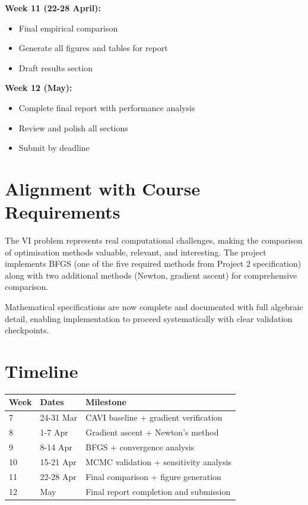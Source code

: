 \documentclass[11pt]{article}
\begin{document}
\textbf{Week 11 (22-28 April):}
\begin{itemize}
\item Final empirical comparison
\item Generate all figures and tables for report
\item Draft results section
\end{itemize}

\textbf{Week 12 (May):}
\begin{itemize}
\item Complete final report with performance analysis
\item Review and polish all sections
\item Submit by deadline
\end{itemize}

\section*{Alignment with Course Requirements}

The VI problem represents real computational challenges, making the comparison of optimisation methods valuable, relevant, and interesting. The project implements BFGS (one of the five required methods from Project 2 specification) along with two additional methods (Newton, gradient ascent) for comprehensive comparison.

Mathematical specifications are now complete and documented with full algebraic detail, enabling implementation to proceed systematically with clear validation checkpoints.

\section*{Timeline}

\begin{center}
\begin{tabular}{|l|l|p{7cm}|}
\hline
\textbf{Week} & \textbf{Dates} & \textbf{Milestone} \\
\hline
7 & 24-31 Mar & CAVI baseline + gradient verification \\
8 & 1-7 Apr & Gradient ascent + Newton's method \\
9 & 8-14 Apr & BFGS + convergence analysis \\
10 & 15-21 Apr & MCMC validation + sensitivity analysis \\
11 & 22-28 Apr & Final comparison + figure generation \\
12 & May & Final report completion and submission \\
\hline
\end{tabular}
\end{center}
\end{document}
